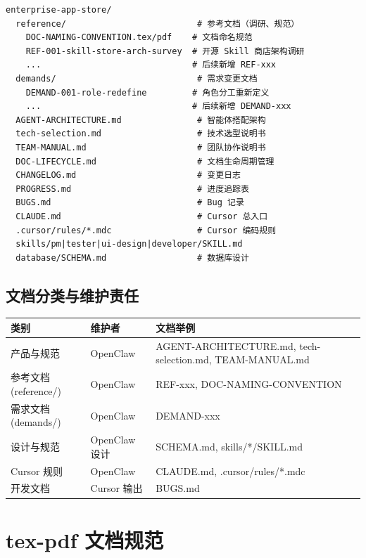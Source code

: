 \documentclass[11pt,a4paper]{article}
\begin{document}
\begin{lstlisting}
enterprise-app-store/
  reference/                          # 参考文档（调研、规范）
    DOC-NAMING-CONVENTION.tex/pdf    # 文档命名规范
    REF-001-skill-store-arch-survey  # 开源 Skill 商店架构调研
    ...                              # 后续新增 REF-xxx
  demands/                            # 需求变更文档
    DEMAND-001-role-redefine         # 角色分工重新定义
    ...                              # 后续新增 DEMAND-xxx
  AGENT-ARCHITECTURE.md               # 智能体搭配架构
  tech-selection.md                   # 技术选型说明书
  TEAM-MANUAL.md                      # 团队协作说明书
  DOC-LIFECYCLE.md                    # 文档生命周期管理
  CHANGELOG.md                        # 变更日志
  PROGRESS.md                         # 进度追踪表
  BUGS.md                             # Bug 记录
  CLAUDE.md                           # Cursor 总入口
  .cursor/rules/*.mdc                 # Cursor 编码规则
  skills/pm|tester|ui-design|developer/SKILL.md
  database/SCHEMA.md                  # 数据库设计
\end{lstlisting}

\subsection{文档分类与维护责任}

\begin{table}[h]
\centering
\small
\begin{tabular}{llp{4.5cm}}
\toprule
\textbf{类别} & \textbf{维护者} & \textbf{文档举例} \\
\midrule
产品与规范 & OpenClaw & AGENT-ARCHITECTURE.md, tech-selection.md, TEAM-MANUAL.md \\
参考文档 (reference/) & OpenClaw & REF-xxx, DOC-NAMING-CONVENTION \\
需求文档 (demands/) & OpenClaw & DEMAND-xxx \\
设计与规范 & OpenClaw 设计 & SCHEMA.md, skills/*/SKILL.md \\
Cursor 规则 & OpenClaw & CLAUDE.md, .cursor/rules/*.mdc \\
开发文档 & Cursor 输出 & BUGS.md \\
\bottomrule
\end{tabular}
\end{table}

\section{tex-pdf 文档规范}
\end{document}
